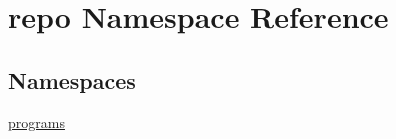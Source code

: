\hypertarget{namespacerepo}{\section{repo Namespace Reference}
\label{namespacerepo}
}
\subsection*{Namespaces}
\begin{DoxyCompactItemize}
\item 
\hyperlink{namespacerepo_1_1programs}{programs}
\end{DoxyCompactItemize}
